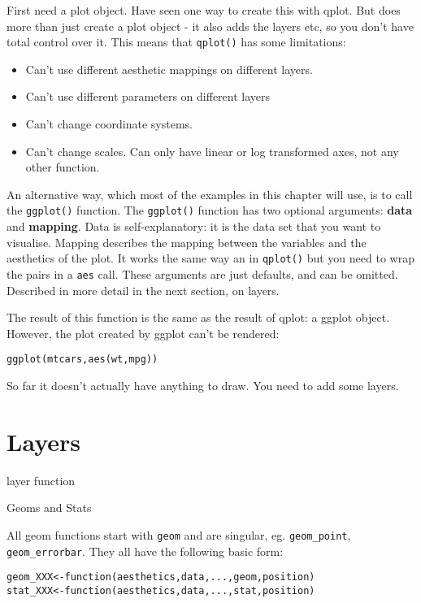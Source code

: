 First need a plot object.  Have seen one way to create this with qplot.  But does more than just create a plot object - it also adds the layers etc, so you don't have total control over it. This means that {\tt qplot()} has some limitations:

\begin{itemize}
  \item Can't use different aesthetic mappings on different layers.  
  \item Can't use different parameters on different layers
  \item Can't change coordinate systems.  
  \item Can't change scales.  Can only have linear or log transformed axes, not any other function.
\end{itemize}

An alternative way, which most of the examples in this chapter will use, is to call the {\tt ggplot()} function.  The {\tt ggplot()} function has two optional arguments: {\bf data} and {\bf mapping}.  Data is self-explanatory: it is the data set that you want to visualise.  Mapping describes the mapping between the variables and the aesthetics of the plot.  It works the same way an in {\tt qplot()} but you need to wrap the pairs in a {\tt aes} call.  These arguments are just defaults, and can be omitted.  Described in more detail in the next section, on layers.

The result of this function is the same as the result of qplot: a ggplot object.  However, the plot created by ggplot can't be rendered:

\begin{alltt}
  ggplot(mtcars, aes(wt, mpg))
\end{alltt}

So far it doesn't actually have anything to draw.  You need to add some layers.

\section{Layers}\label{sec:layers}

layer function

Geoms and Stats

All geom functions start with {\tt geom} and are singular, eg. {\tt geom\_point}, {\tt geom\_errorbar}.  They all have the following basic form:

\begin{alltt}
geom_XXX <- function(aesthetics, data, ..., geom, position) {}
stat_XXX <- function(aesthetics, data, ..., stat, position) {}
\end{alltt}

